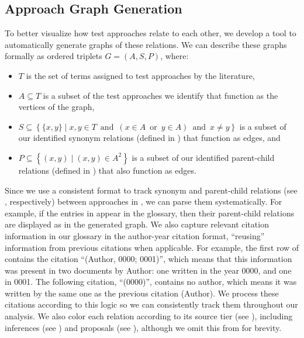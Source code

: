     \subsection{Approach Graph Generation}\label{graph-gen}
\fi

To better visualize how test approaches relate to each other, we
develop a tool to automatically generate graphs of these relations.
\ifnotpaper We can describe these graphs formally as ordered triplets
    $G = (A, S, P)$, where:  %
    \begin{itemize}
        \item $T$ is the set of terms assigned to test approaches by the
              literature,
        \item $A \subseteq T$ is a subset of the \approachCount{} test
              approaches we identify that function as the vertices of the graph,
        \item $S \subseteq \left\{ \{x, y\} \mid x, y \in T \,\textrm{ and }\,
                  (x \in A \,\textrm{ or }\, y \in A) \,\textrm{ and }\, x \neq y \right\}$
              is a subset of our identified synonym relations (defined
              in ) that function as edges, and
        \item $P \subseteq \left\{(x,y) \mid (x, y) \in A^2 \right\}$ is a
              subset of our identified parent-child relations (defined in
              ) that also function as edges.
    \end{itemize}

    Since we use a consistent format to track synonym and parent-child
    relations (see , respectively)
    between approaches in \ourApproachGlossary{}, we can parse them
    systematically. For example, if the entries in 
    appear in the glossary, then their parent-child relations are displayed as
     in the generated graph. We also capture relevant
    citation information in our glossary in the author-year citation format,
    ``reusing'' information from previous citations when applicable.
    For example, the first row of 
    contains the citation ``(Author, 0000; 0001)'', which means that this
    information was present in two documents by Author: one written in
    the year 0000, and one in 0001. The following citation, ``(0000)'',
    contains no author, which means it was written by the same one as the
    previous citation (Author). We process these citations according to this
    logic  so we can
    consistently track them throughout our analysis. We also color each
    relation according to its source tier (see ), including
    inferences (see ) and proposals (see ),
    although we omit this from  for brevity.

